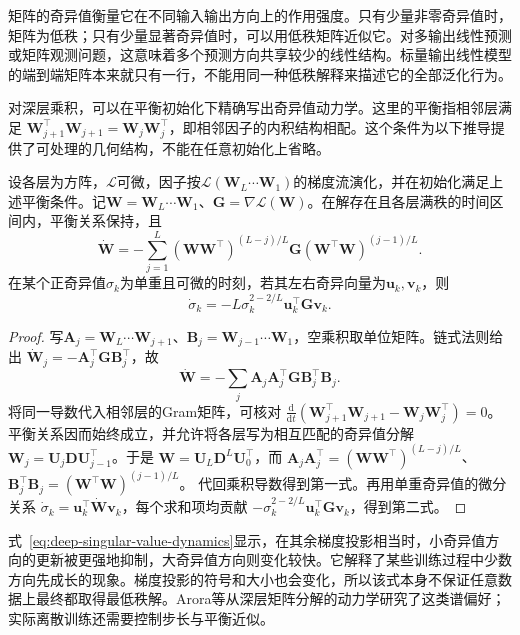 矩阵的奇异值衡量它在不同输入输出方向上的作用强度。只有少量非零奇异值时，矩阵为低秩；只有少量显著奇异值时，可以用低秩矩阵近似它。对多输出线性预测或矩阵观测问题，这意味着多个预测方向共享较少的线性结构。标量输出线性模型的端到端矩阵本来就只有一行，不能用同一种低秩解释来描述它的全部泛化行为。

对深层乘积，可以在平衡初始化下精确写出奇异值动力学。这里的平衡指相邻层满足
$\bm W_{j+1}^\top\bm W_{j+1}=\bm W_j\bm W_j^\top$，即相邻因子的内积结构相配。这个条件为以下推导提供了可处理的几何结构，不能在任意初始化上省略。

\begin{theorem}[平衡深层线性网络的梯度流]
\label{thm:balanced-deep-linear-flow}
设各层为方阵，$\mathcal L$可微，因子按$\mathcal L(\bm W_L\cdots\bm W_1)$的梯度流演化，并在初始化满足上述平衡条件。记$\bm W=\bm W_L\cdots\bm W_1$、$\bm G=\nabla\mathcal L(\bm W)$。在解存在且各层满秩的时间区间内，平衡关系保持，且
\begin{equation}
 \dot{\bm W}
 =-\sum_{j=1}^{L}
   (\bm W\bm W^\top)^{(L-j)/L}\bm G
   (\bm W^\top\bm W)^{(j-1)/L}.
 \label{eq:balanced-matrix-gradient-flow}
\end{equation}
在某个正奇异值$\sigma_k$为单重且可微的时刻，若其左右奇异向量为$\bm u_k,\bm v_k$，则
\begin{equation}
 \dot\sigma_k=-L\sigma_k^{2-2/L}\bm u_k^\top\bm G\bm v_k.
 \label{eq:deep-singular-value-dynamics}
\end{equation}
\end{theorem}
\begin{proof}
写$\bm A_j=\bm W_L\cdots\bm W_{j+1}$、$\bm B_j=\bm W_{j-1}\cdots\bm W_1$，空乘积取单位矩阵。链式法则给出
$\dot{\bm W}_j=-\bm A_j^\top\bm G\bm B_j^\top$，故
\[
 \dot{\bm W}=-\sum_j\bm A_j\bm A_j^\top\bm G\bm B_j^\top\bm B_j.
\]
将同一导数代入相邻层的Gram矩阵，可核对
$\frac{\mathrm d}{\mathrm dt}(\bm W_{j+1}^\top\bm W_{j+1}-\bm W_j\bm W_j^\top)=0$。
平衡关系因而始终成立，并允许将各层写为相互匹配的奇异值分解
$\bm W_j=\bm U_j\bm D\bm U_{j-1}^\top$。于是
$\bm W=\bm U_L\bm D^L\bm U_0^\top$，而
$\bm A_j\bm A_j^\top=(\bm W\bm W^\top)^{(L-j)/L}$、
$\bm B_j^\top\bm B_j=(\bm W^\top\bm W)^{(j-1)/L}$。
代回乘积导数得到第一式。再用单重奇异值的微分关系
$\dot\sigma_k=\bm u_k^\top\dot{\bm W}\bm v_k$，每个求和项均贡献
$-\sigma_k^{2-2/L}\bm u_k^\top\bm G\bm v_k$，得到第二式。
\end{proof}

式~\eqref{eq:deep-singular-value-dynamics}显示，在其余梯度投影相当时，小奇异值方向的更新被更强地抑制，大奇异值方向则变化较快。它解释了某些训练过程中少数方向先成长的现象。梯度投影的符号和大小也会变化，所以该式本身不保证任意数据上最终都取得最低秩解。Arora等从深层矩阵分解的动力学研究了这类谱偏好；实际离散训练还需要控制步长与平衡近似。

